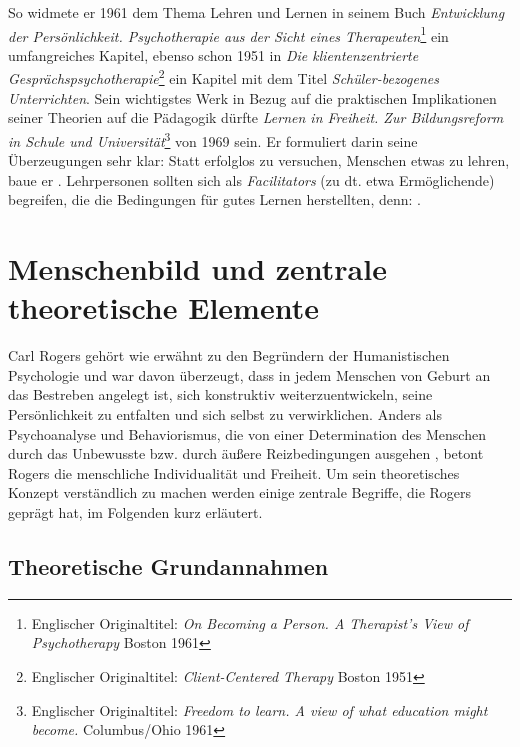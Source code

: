 \documentclass[
  twoside,
  parskip=half-,
  paper=176mm:246mm,
  BCOR=14mm,
  DIV=14,
]{scrreprt}
\begin{document}
So widmete er 1961 dem Thema Lehren und Lernen in seinem Buch \textit{Entwicklung der Persönlichkeit. Psychotherapie aus der Sicht eines Therapeuten}\footnote{Englischer Originaltitel: \textit{On Becoming a Person. A Therapist's View of Psychotherapy} Boston 1961} ein umfangreiches Kapitel, ebenso schon 1951 in \textit{Die klientenzentrierte Gesprächspsychotherapie}\footnote{Englischer Originaltitel: \textit{Client-Centered Therapy} Boston 1951} ein Kapitel mit dem Titel \textit{Schüler-bezogenes Unterrichten}. Sein wichtigstes Werk in Bezug auf die praktischen Implikationen seiner Theorien auf die Pädagogik dürfte \textit{Lernen in Freiheit. Zur Bildungsreform in Schule und Universität}\footnote{Englischer Originaltitel: \textit{Freedom to learn. A view of what education might become.} Columbus/Ohio 1961} von 1969 sein.  Er formuliert darin seine Überzeugungen sehr klar:  Statt erfolglos zu versuchen, Menschen etwas zu lehren, baue er . Lehrpersonen sollten sich als \textit{Facilitators} (zu dt. etwa Ermöglichende) begreifen, die die Bedingungen für gutes Lernen herstellten, denn: .

\section{Menschenbild und zentrale theoretische Elemente}

Carl Rogers gehört wie erwähnt zu den Begründern der Humanistischen Psychologie und war davon überzeugt, dass in jedem Menschen von Geburt an das Bestreben angelegt ist, sich konstruktiv weiterzuentwickeln, seine Persönlichkeit zu entfalten und sich selbst zu verwirklichen. Anders als Psychoanalyse und Behaviorismus, die von einer Determination des Menschen durch das Unbewusste bzw. durch äußere Reizbedingungen ausgehen \autocite[vgl.][35]{weinberger}, betont Rogers die menschliche Individualität und Freiheit. Um sein theoretisches Konzept verständlich zu machen werden einige zentrale Begriffe, die Rogers geprägt hat, im Folgenden kurz erläutert.

\subsection{Theoretische Grundannahmen}
\end{document}
